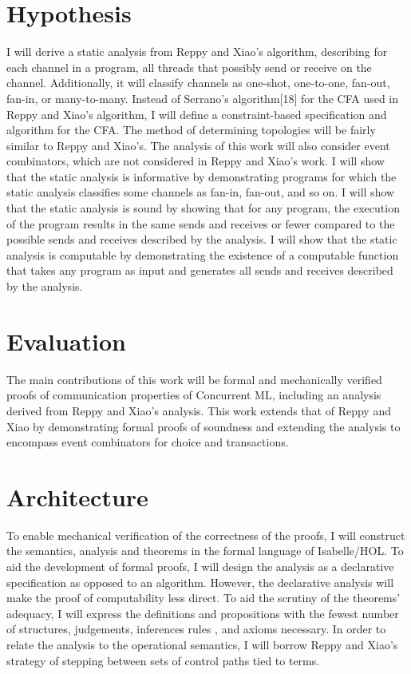 \documentclass{article}
\begin{document}
\section{Hypothesis}
I will derive a static analysis from Reppy and Xiao's algorithm, describing for each channel in
a program, all threads that possibly send or receive on the channel.  Additionally, it will
classify channels as one-shot, one-to-one, fan-out, fan-in, or many-to-many.  Instead of
Serrano's algorithm[18] for the CFA used in Reppy and Xiao's algorithm, I will define a
constraint-based specification and algorithm for the CFA.  The method of determining topologies
will be fairly similar to Reppy and Xiao's.  The analysis of this work will also consider event
combinators, which are not considered in Reppy and Xiao's work.  I will show that the static
analysis is informative by demonstrating programs for which the static analysis classifies some
channels as fan-in, fan-out, and so on.  I will show that the static analysis is sound by
showing that for any program, the execution of the program results in the same sends and
receives or fewer compared to the possible sends and receives described by the analysis.  I
will show that the static analysis is computable by demonstrating the existence of a
computable function that takes any program as input and generates all sends and receives
described by the analysis.


\section{Evaluation}
The main contributions of this work will be formal and mechanically verified proofs of
communication properties of Concurrent ML, including an analysis derived from Reppy and Xiao's
analysis.  This work extends that of Reppy and Xiao by demonstrating formal proofs of soundness
and extending the analysis to encompass event combinators for choice and transactions.


\section{Architecture}
To enable mechanical verification of the correctness of the proofs, I will construct the
semantics, analysis and theorems in the formal language of Isabelle/HOL.  To aid the
development of formal proofs, I will design the analysis as a declarative specification as
opposed to an algorithm.  However, the declarative analysis will make the proof of
computability less direct.  To aid the scrutiny of the theorems' adequacy, I will express the
definitions and propositions with the fewest number of structures, judgements, inferences rules
, and axioms necessary. In order to relate the analysis to the operational semantics, I will
borrow Reppy and Xiao's strategy of stepping between sets of control paths tied to terms.
\end{document}
